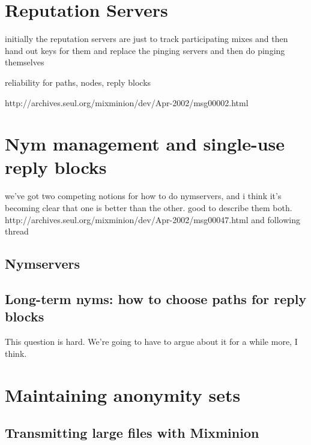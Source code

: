 \documentclass{llncs}
\begin{document}

\section{Reputation Servers}

initially the reputation servers are just to track participating
mixes
and then hand out keys for them
and replace the pinging servers
and then do pinging themselves

reliability for paths, nodes, reply blocks

http://archives.seul.org/mixminion/dev/Apr-2002/msg00002.html


\section{Nym management and single-use reply blocks}

we've got two competing notions for how to do nymservers, and i think
it's becoming clear that one is better than the other. good to describe
them both.
http://archives.seul.org/mixminion/dev/Apr-2002/msg00047.html
and following thread

\subsection{Nymservers}

\subsection{Long-term nyms: how to choose paths for reply blocks}

This question is hard. We're going to have to argue about it for a
while more, I think.


\section{Maintaining anonymity sets}

\subsection{Transmitting large files with Mixminion}
\end{document}
